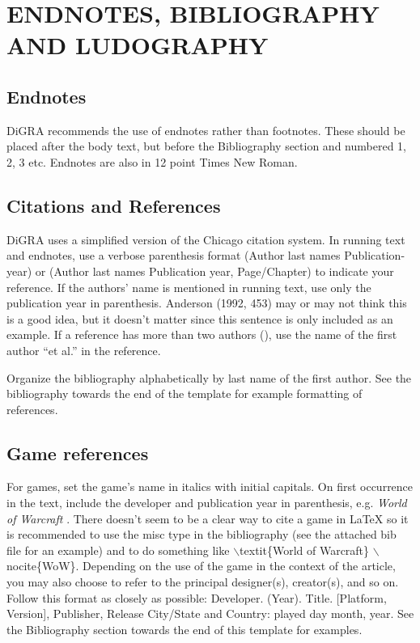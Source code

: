 \documentclass[11pt]{article}
\let\originalcite\cite
\renewcommand*{\cite}[1]{(\originalcite{#1})}
\begin{document}
\section*{ENDNOTES, BIBLIOGRAPHY AND LUDOGRAPHY}
\subsection*{Endnotes}
DiGRA recommends the use of endnotes rather than footnotes. These should be placed
after the body text, but before the Bibliography section and numbered 1, 2, 3 etc.
Endnotes are also in 12 point Times New Roman.

\subsection*{Citations and References}
DiGRA uses a simplified version of the Chicago citation system. In running text and
endnotes, use a verbose parenthesis format (Author last names Publication-year) or
(Author last names Publication year, Page/Chapter) to indicate your reference. If the
authors’ name is mentioned in running text, use only the publication year in parenthesis.
 Anderson (1992, 453) \nocite{ethics} may or may not think this is a good idea, but it doesn’t matter since
this sentence is only included as an example. If a reference has more than two authors
\cite{schwartz.1995}, use the name of the first author ``et al.'' in the reference. 

Organize the bibliography alphabetically by last name of the first author. See the
bibliography towards the end of the template for example formatting of references.
\subsection*{Game references}
For games, set the game’s name in italics with initial capitals. On first occurrence in the
text, include the developer and publication year in parenthesis, e.g. \textit{World of Warcraft}
\nocite{WoW}. There doesn't seem to be a clear way to cite a game in LaTeX so it is recommended to use the misc type in the bibliography (see the attached bib file for an example) and to do something like $\backslash$textit\{World of Warcraft\} $\backslash$nocite\{WoW\}.  Depending on the use of the game in the context of the article, you may
also choose to refer to the principal designer(s), creator(s), and so on. Follow this format
as closely as possible:
Developer. (Year). Title. [Platform, Version], Publisher, Release City/State and Country:
played day month, year.
See the Bibliography section towards the end of this template for examples.
\end{document}
